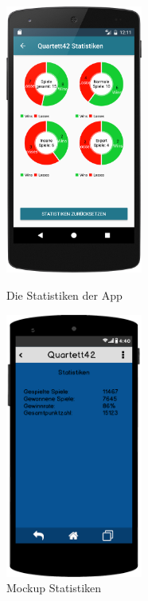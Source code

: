 \begin{figure}[h]
    \centering
    \begin{minipage}{0.49\textwidth}
        \centering
        \includegraphics[width=0.4\textwidth]{img/screenshots/device_statistics.png}
		\caption{Die Statistiken der App}
		\label{figure:implementierungstatistiken}
	\end{minipage}
    \begin{minipage}{0.49\textwidth}
        \centering
        \includegraphics[width=0.4\textwidth]{img/mockups/statistiken.png}
        \caption{Mockup Statistiken}
    \end{minipage}
\end{figure}


